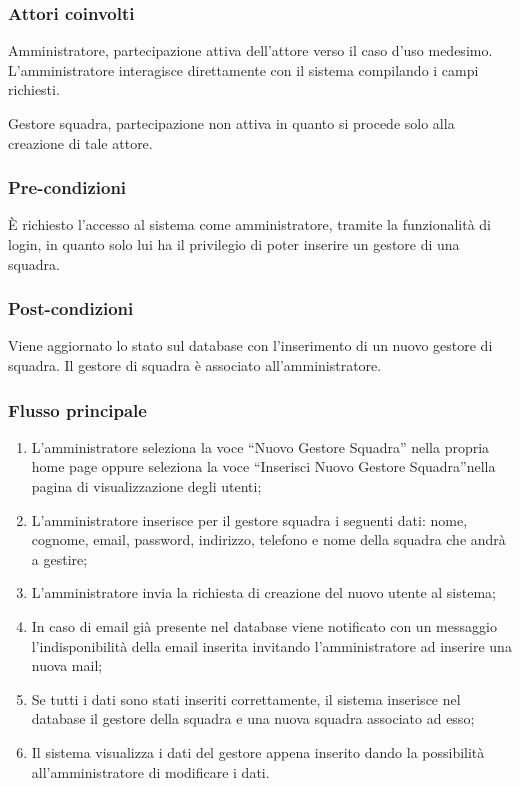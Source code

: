 \subsubsection*{Attori coinvolti}
Amministratore, partecipazione attiva dell'attore verso il caso d'uso medesimo.
L'amministratore interagisce direttamente con il sistema compilando i campi richiesti.

Gestore squadra, partecipazione non attiva in quanto si procede solo alla creazione di tale attore.

\subsubsection*{Pre-condizioni}
È richiesto l'accesso al sistema come amministratore, tramite la funzionalità di login, in quanto solo lui ha il privilegio di poter inserire un gestore di una squadra.

\subsubsection*{Post-condizioni}
Viene aggiornato lo stato sul database con l'inserimento di un nuovo gestore di squadra. Il gestore di squadra è associato all'amministratore.

\subsubsection*{Flusso principale}

\begin{enumerate}
	
	\item
	L'amministratore seleziona la voce ``Nuovo Gestore Squadra'' nella propria home page oppure seleziona la voce ``Inserisci Nuovo Gestore Squadra''nella pagina di visualizzazione degli utenti;
	
	\item
	L'amministratore inserisce per il gestore squadra i seguenti dati: nome, cognome, email, password, indirizzo, telefono e nome della squadra che andrà a gestire;
	
	\item
	L'amministratore invia la richiesta di creazione del nuovo utente al sistema;
	
	\item
	In caso di email già presente nel database viene notificato con un messaggio l'indisponibilità della email inserita invitando l'amministratore ad inserire una nuova mail;
	
	\item
	Se tutti i dati sono stati inseriti correttamente, il sistema inserisce nel database il gestore della squadra e una nuova squadra associato ad esso;
	
	\item
	Il sistema visualizza i dati del gestore appena inserito dando la possibilità all'amministratore di modificare i dati.
	
\end{enumerate}

